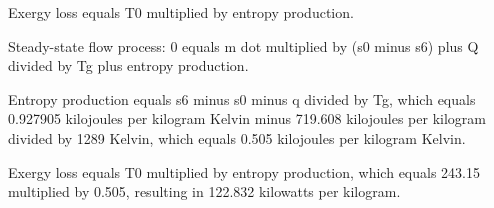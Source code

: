 Exergy loss equals T0 multiplied by entropy production.  

Steady-state flow process:  
0 equals m dot multiplied by (s0 minus s6) plus Q divided by Tg plus entropy production.  

Entropy production equals s6 minus s0 minus q divided by Tg, which equals 0.927905 kilojoules per kilogram Kelvin minus 719.608 kilojoules per kilogram divided by 1289 Kelvin, which equals 0.505 kilojoules per kilogram Kelvin.  

Exergy loss equals T0 multiplied by entropy production, which equals 243.15 multiplied by 0.505, resulting in 122.832 kilowatts per kilogram.